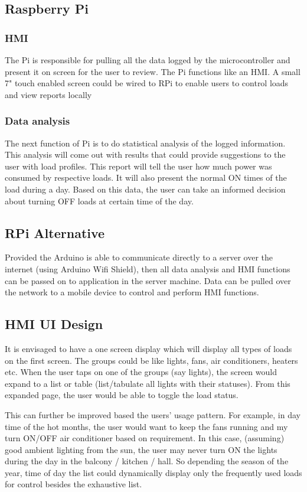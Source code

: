 \documentclass[a4paper,11pt,titlepage]{article}
\begin{document}
\subsection{Raspberry Pi}
\label{sec:orgb4bce5f}
\subsubsection{HMI}
\label{sec:org79aa924}
The Pi is responsible for pulling all the data logged by the
microcontroller and present it on screen for the user to review. The
Pi functions like an HMI. A small 7" touch enabled screen could be
wired to RPi to enable users to control loads and view reports locally
\subsubsection{Data analysis}
\label{sec:org99d6979}
The next function of Pi is to do statistical analysis of the logged
information. This analysis will come out with results that could
provide suggestions to the user with load profiles. This report will
tell the user how much power was consumed by respective loads. It will
also present the normal ON times of the load during a day. Based on
this data, the user can take an informed decision about turning OFF
loads at certain time of the day.

\subsection{RPi Alternative}
\label{sec:org9d4aded}
Provided the Arduino is able to communicate directly to a server over
the internet (using Arduino Wifi Shield), then all data analysis and
HMI functions can be passed on to application in the server
machine. Data can be pulled over the network to a mobile device to
control and perform HMI functions.
\subsection{HMI UI Design}
\label{sec:org03dafd8}
It is envisaged to have a one screen display which will display all
types of loads on the first screen. The groups could be like lights,
fans, air conditioners, heaters etc.  When the user taps on one of the
groups (say lights), the screen would expand to a list or table
(list/tabulate all lights with their statuses). From this expanded
page, the user would be able to toggle the load status.  

This can further be improved based the users' usage pattern. For
example, in day time of the hot months, the user would want to keep
the fans running and my turn ON/OFF air conditioner based on
requirement. In this case, (assuming) good ambient lighting from the
sun, the user may never turn ON the lights during the day in the
balcony / kitchen / hall. So depending the season of the year, time of
day the list could dynamically display only the frequently used loads
for control besides the exhaustive list.
\end{document}
